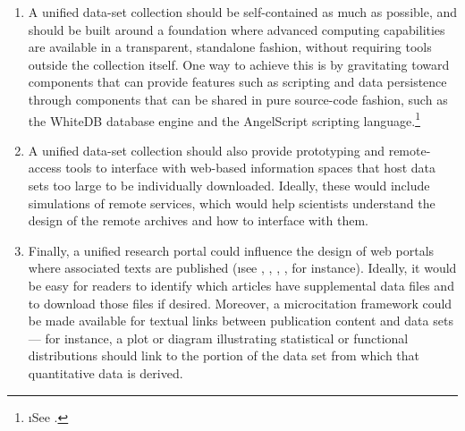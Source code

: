 {\begin{enumerate}[leftmargin=3pt, itemsep=-1pt,topsep=8pt]
\item{}  A unified data-set collection should 
be self-contained as much as possible, and should be 
built around a foundation where advanced computing 
capabilities are available in a transparent, 
standalone fashion, without requiring tools 
outside the collection itself.  One way to 
achieve this is by gravitating 
toward components that can provide 
features such as scripting and data persistence 
through components that can be shared 
in pure source-code fashion, 
such as the WhiteDB database engine 
\cite{EnarReilent} and the AngelScript 
scripting 
language.\footnote{\i{See} 
.}   

\item{}  A unified data-set collection should also provide 
prototyping and remote-access tools to interface with 
web-based information spaces that host data sets 
too large to be individually downloaded.  Ideally, 
these would include simulations of remote services, which 
would help scientists understand the design of 
the remote archives and how to interface with them. 

\item{}  Finally, a unified research portal could  
influence the design of web portals where associated 
texts are published (\i{see} \cite{HelenaCousijn}, 
\cite{AlessiaBardi}, \cite{MarkusSuhr},
\cite{BarbaraMcGillivray}, for instance).   
Ideally, it would be easy for readers to 
identify which articles have supplemental data files and 
to download those files if desired.  Moreover, 
a microcitation framework could be made available 
for textual links between publication 
content and data sets --- for instance, a plot or 
diagram illustrating statistical or functional distributions 
should link to the portion of the data set from which that 
quantitative data is derived.
\end{enumerate}}

\vspace{-9pt}




